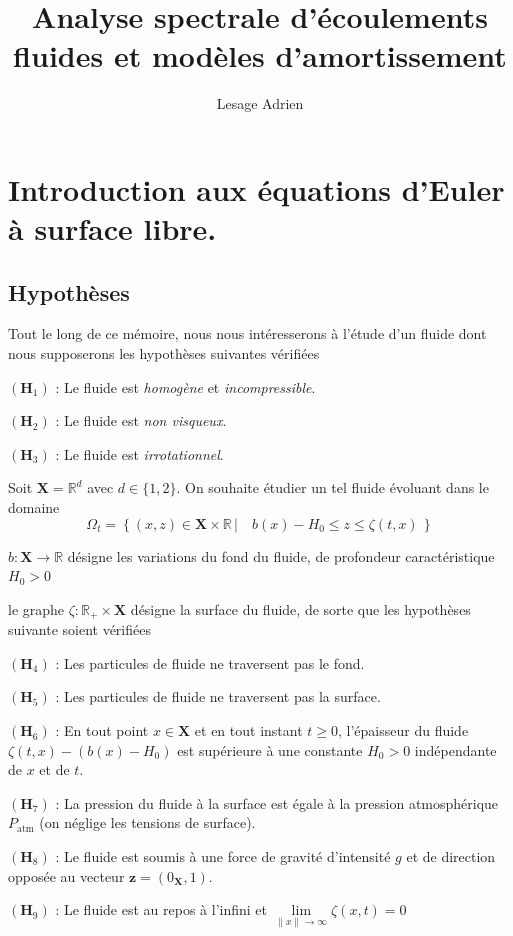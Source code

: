 \documentclass[12pt,a4paper]{article}
\numberwithin{equation}{section}
\begin{document}
\title{Analyse spectrale d'écoulements fluides et modèles d'amortissement}
\author{Lesage Adrien}
\maketitle
\newpage
\tableofcontents
\newpage
\section{Introduction aux équations d'Euler à surface libre.}
\subsection{Hypothèses}

Tout le long de ce mémoire, nous nous intéresserons à l'étude d'un fluide dont nous supposerons les hypothèses suivantes vérifiées
\begin{list}{}{}
    \item[$(\textbf{H}_1)$ : ] Le fluide est \textit{homogène} et \textit{incompressible}.
    \item[$(\textbf{H}_2)$ : ] Le fluide est \textit{non visqueux}.
    \item[$(\textbf{H}_3)$ : ] Le fluide est \textit{irrotationnel}.
\end{list}

Soit $\textbf{X} = \mathbb{R}^d$ avec $d \in \{1,2\}$. On souhaite étudier un tel fluide évoluant dans le domaine $$\Omega_t = \left\{ (x,z) \in \textbf{X}\times\mathbb{R}  \,|\quad b(x) - H_0 \leq z \leq \zeta(t,x) \,\right\}$$
\begin{list}{}{}
\item[\textbullet] $b : \textbf{X}\rightarrow \mathbb{R}$ désigne les variations du fond du fluide, de profondeur caractéristique $H_0 > 0$
\item[\textbullet] le graphe $\zeta : \mathbb{R}_+\times \textbf{X}$ désigne la surface du fluide, de sorte que les hypothèses suivante soient vérifiées
\end{list}


\begin{list}{}{}
    \item[$(\textbf{H}_4)$ : ] Les particules de fluide ne traversent pas le fond.
    \item[$(\textbf{H}_5)$ : ] Les particules de fluide ne traversent pas la surface.
    \item[$(\textbf{H}_6)$ : ]  En tout point $x\in\textbf{X}$ et en tout instant $t\geq 0$, l'épaisseur du fluide $\zeta(t,x) - (b(x)-H_0)$ est supérieure à une constante $H_0>0$ indépendante de $x$ et de $t$.
    \item[$(\textbf{H}_7)$ : ] La pression  du fluide à la surface est égale à la pression atmosphérique $P_{\text{atm}}$ (on néglige les tensions de surface).
    \item[$(\textbf{H}_8)$ : ] Le fluide est soumis à une force de gravité d'intensité $g$ et de direction opposée au vecteur $\textbf{z} = (0_{\textbf{X}},1)$.
    \item[$(\textbf{H}_9)$ : ] Le fluide est au repos à l'infini et $\lim\limits_{\|x\|\rightarrow \infty}\zeta(x,t) = 0$
\end{list}
\end{document}
